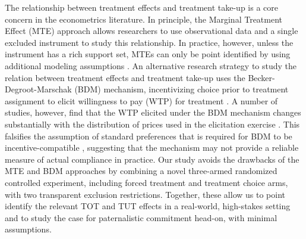 \documentclass[12pt, a4paper]{article}
\begin{document}
The relationship between treatment effects and treatment take-up is a core concern in the econometrics literature. In principle, the Marginal Treatment Effect (MTE) approach allows researchers to use observational data and a single excluded instrument to study this relationship. In practice, however, unless the instrument has a rich support set, MTEs can only be point identified by using additional modeling assumptions \citep{mogstad2018using}. An alternative research strategy to study the relation between treatment effects and treatment take-up uses the Becker-Degroot-Marschak (BDM) mechanism, incentivizing choice prior to treatment assignment to elicit willingness to pay (WTP) for treatment \citep{becker1964measuring}. 
A number of studies, however, find that the WTP elicited under the BDM mechanism changes substantially with the distribution of prices used in the elicitation exercise \citep{bohm1997eliciting,banerji2014detection}. This falsifies the assumption of standard preferences that is required for BDM to be incentive-compatible \cite{mamadehussene2023reliability}, suggesting that the mechanism may not provide a reliable measure of actual compliance  in practice.
Our study avoids the drawbacks of the MTE and BDM approaches by combining a novel three-armed randomized controlled experiment, including forced treatment and treatment choice arms, with two transparent exclusion restrictions. Together, these allow us to point identify the relevant TOT and TUT effects in a real-world, high-stakes setting and to study the case for paternalistic commitment head-on, with minimal assumptions.
\end{document}
